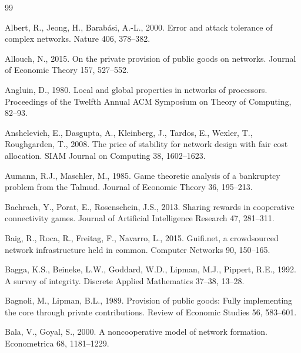 \documentclass[preprint,12pt,authoryear]{elsarticle}
\begin{document}
\begingroup
\small
\begin{thebibliography}{99}

Albert, R., Jeong, H., Barab\'asi, A.-L., 2000.
Error and attack tolerance of complex networks. Nature 406, 378--382.

Allouch, N., 2015.
On the private provision of public goods on networks.
Journal of Economic Theory 157, 527--552.

Angluin, D., 1980.
Local and global properties in networks of processors.
Proceedings of the Twelfth Annual ACM Symposium on Theory of Computing,
82--93.

Anshelevich, E., Dasgupta, A., Kleinberg, J., Tardos, E., Wexler, T.,
Roughgarden, T., 2008.
The price of stability for network design with fair cost allocation.
SIAM Journal on Computing 38, 1602--1623.

Aumann, R.J., Maschler, M., 1985.
Game theoretic analysis of a bankruptcy problem from the Talmud.
Journal of Economic Theory 36, 195--213.

Bachrach, Y., Porat, E., Rosenschein, J.S., 2013.
Sharing rewards in cooperative connectivity games.
Journal of Artificial Intelligence Research 47, 281--311.

Baig, R., Roca, R., Freitag, F., Navarro, L., 2015.
Guifi.net, a crowdsourced network infrastructure held in common.
Computer Networks 90, 150--165.

Bagga, K.S., Beineke, L.W., Goddard, W.D., Lipman, M.J., Pippert, R.E., 1992.
A survey of integrity. Discrete Applied Mathematics 37--38, 13--28.

Bagnoli, M., Lipman, B.L., 1989.
Provision of public goods: Fully implementing the core through private
contributions. Review of Economic Studies 56, 583--601.

Bala, V., Goyal, S., 2000.
A noncooperative model of network formation. Econometrica 68, 1181--1229.


\end{thebibliography}
\end{document}
